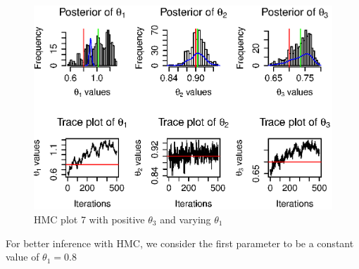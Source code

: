 \documentclass[a4paper,11pt]{article}
\begin{document}
\newpage
\begin{figure}[H]
\centering
\includegraphics[width=140mm]{hmcplots7_combined.eps}
\caption{HMC plot 7 with positive $\theta_3$ and varying $\theta_1$}
\end{figure}









\newpage
For better inference with HMC, we consider the first parameter to be a constant value of $\theta_1 = 0.8$
\end{document}
